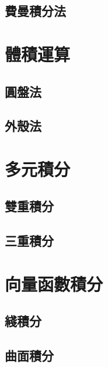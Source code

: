 \documentclass[12pt]{article}
\begin{document}
    \subsection*{費曼積分法}
    \section*{體積運算}
    \subsection*{圓盤法}
    \subsection*{外殼法}
    \section*{多元積分}
    \subsection*{雙重積分}
    \subsection*{三重積分}
    \section*{向量函數積分}
    \subsection*{綫積分}
    \subsection*{曲面積分}
\end{document}
